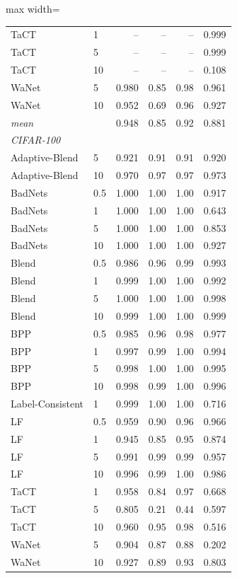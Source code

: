 \begin{table}[htbp]
\begin{adjustbox}{max width=\linewidth}
\begin{tabular}{llrrrr}
TaCT & 1 & -- & -- & -- & 0.999 \\
TaCT & 5 & -- & -- & -- & 0.999 \\
TaCT & 10 & -- & -- & -- & 0.108 \\
WaNet & 5 & 0.980 & 0.85 & 0.98 & 0.961 \\
WaNet & 10 & 0.952 & 0.69 & 0.96 & 0.927 \\
\rowcolor{black!8}\emph{mean} &  & 0.948 & 0.85 & 0.92 & 0.881 \\
\multicolumn{6}{l}{\emph{CIFAR-100}} \\
Adaptive-Blend & 5 & 0.921 & 0.91 & 0.91 & 0.920 \\
Adaptive-Blend & 10 & 0.970 & 0.97 & 0.97 & 0.973 \\
BadNets & 0.5 & 1.000 & 1.00 & 1.00 & 0.917 \\
BadNets & 1 & 1.000 & 1.00 & 1.00 & 0.643 \\
BadNets & 5 & 1.000 & 1.00 & 1.00 & 0.853 \\
BadNets & 10 & 1.000 & 1.00 & 1.00 & 0.927 \\
Blend & 0.5 & 0.986 & 0.96 & 0.99 & 0.993 \\
Blend & 1 & 0.999 & 1.00 & 1.00 & 0.992 \\
Blend & 5 & 1.000 & 1.00 & 1.00 & 0.998 \\
Blend & 10 & 0.999 & 1.00 & 1.00 & 0.999 \\
BPP & 0.5 & 0.985 & 0.96 & 0.98 & 0.977 \\
BPP & 1 & 0.997 & 0.99 & 1.00 & 0.994 \\
BPP & 5 & 0.998 & 1.00 & 1.00 & 0.995 \\
BPP & 10 & 0.998 & 0.99 & 1.00 & 0.996 \\
Label-Consistent & 1 & 0.999 & 1.00 & 1.00 & 0.716 \\
LF & 0.5 & 0.959 & 0.90 & 0.96 & 0.966 \\
LF & 1 & 0.945 & 0.85 & 0.95 & 0.874 \\
LF & 5 & 0.991 & 0.99 & 0.99 & 0.957 \\
LF & 10 & 0.996 & 0.99 & 1.00 & 0.986 \\
TaCT & 1 & 0.958 & 0.84 & 0.97 & 0.668 \\
TaCT & 5 & 0.805 & 0.21 & 0.44 & 0.597 \\
TaCT & 10 & 0.960 & 0.95 & 0.98 & 0.516 \\
WaNet & 5 & 0.904 & 0.87 & 0.88 & 0.202 \\
WaNet & 10 & 0.927 & 0.89 & 0.93 & 0.803 \\

\end{tabular}
\end{adjustbox}
\end{table}
